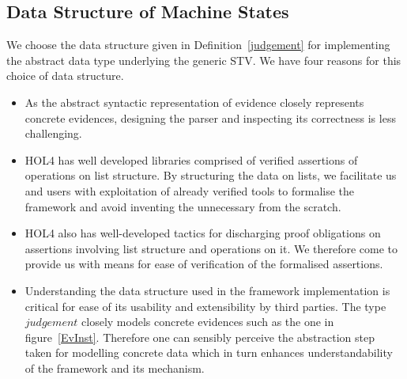 \documentclass[10pt,conference]{IEEEtran}
\begin{document}
\subsection{Data Structure of Machine States}
\label{MachineData}
 We choose the data structure  given in Definition~\ref{judgement} for implementing the abstract data type underlying the generic STV.  We have four reasons for this choice of data structure. 
 \begin{itemize}
\item As the abstract syntactic representation of evidence closely represents concrete evidences, designing the parser and inspecting  its  correctness is less challenging.  
 \item HOL4 has well developed libraries comprised of verified assertions of operations on list structure. By structuring the data on lists, we facilitate us and users  with exploitation of  already verified tools to formalise the framework and avoid inventing the unnecessary from the scratch. 
 \item HOL4 also has well-developed tactics for discharging proof obligations on assertions involving list structure and operations on it. We therefore come to provide us with means for ease of verification of the formalised assertions.
 \item Understanding the data structure used in the  framework implementation is critical for ease of  its usability and extensibility by third parties.  The type $\mathit{judgement}$ closely models concrete evidences such as the one in figure~\ref{EvInst}. Therefore one can sensibly perceive the  abstraction step taken for modelling  concrete data which in turn enhances understandability of the framework and its mechanism. 
   \end{itemize}
\end{document}
